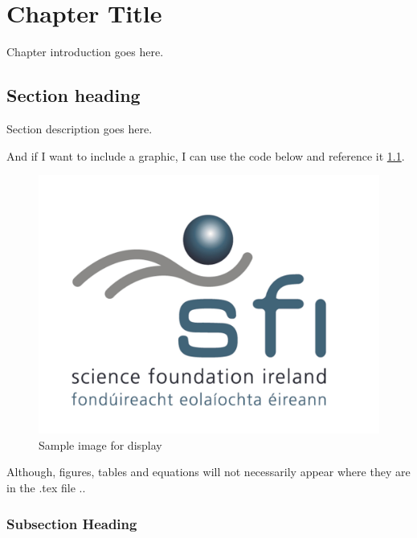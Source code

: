 
\chapter{Chapter Title}\label{chap:chapter_name}

Chapter introduction goes here.

\section{Section heading}\label{section:section_name}

Section description goes here.

And if I want to include a graphic, I can use the code below and reference it \ref{graphics:sample_graphic}.

\begin{figure}\label{graphics:sample_graphic}	
	\centering
		\includegraphics[width=\textwidth]{graphics/logos/SFI.png}
	\caption{Sample image for display}
	\label{graphics:sample_graphic}
\end{figure}

Although, figures, tables and equations will not necessarily appear where they are in the .tex file .. 

\subsection{Subsection Heading}\label{subsection:subsection_name}

